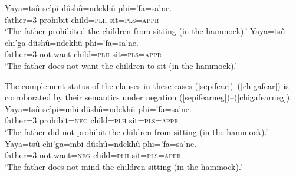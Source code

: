 \documentclass[output=paper,colorlinks,citecolor=brown]{langscibook}
\begin{document}
    \ea \label{sepifear}
    \gll Yaya=tsû se'pi {\ob}dûshû=ndekhû phi='fa=sa'ne.{\cb} \\
         father\textsc{=}3 prohibit child=\textsc{plh} sit=\textsc{pls=appr}   \\
    \glt `The father prohibited the children from sitting (in the hammock).'
    \ex \label{chigafear} %
    \gll Yaya=tsû chi'ga {\ob}dûshû=ndekhû phi='fa=sa'ne.{\cb} \\
         father\textsc{=}3 {not.want} child=\textsc{plh} sit=\textsc{pls=appr} \\
    \glt `The father does not want the children to sit (in the hammock).'
\z

The complement status of the  clauses in these cases (\ref{sepifear})--(\ref{chigafear}) is corroborated by their semantics under negation (\ref{sepifearneg})--(\ref{chigafearneg}).
    \ea \label{sepifearneg}
    \gll Yaya=tsû se'pi=mbi {\ob}dûshû=ndekhû phi='fa=sa'ne.{\cb} \\
         father\textsc{=}3 prohibit=\textsc{neg} child=\textsc{plh} sit=\textsc{pls=appr}   \\
    \glt `The father did not prohibit the children from sitting (in the hammock).'
    \ex \label{chigafearneg} %
    \gll Yaya=tsû chi'ga=mbi {\ob}dûshû=ndekhû phi='fa=sa'ne.{\cb} \\
         father\textsc{=}3 {not.want=\textsc{neg}} child=\textsc{plh} sit=\textsc{pls=appr} \\
    \glt `The father does not mind the children sitting (in the hammock).'
\z
    
\end{document}
